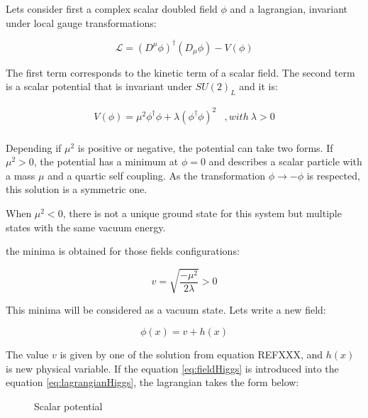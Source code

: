     Lets consider first a complex scalar doubled field $\phi$ and a lagrangian, invariant under local gauge transformations:

    \begin{equation}
      \mathcal{L} = \left(D^{\mu} \phi \right)^{\dagger} \left( D_{\mu} \phi \right) - V(\phi)
      \label{eq:lagrangianHiggs}
    \end{equation}             

    The first term corresponds to the kinetic term of a scalar field.
    The second term is a scalar potential that is invariant under $SU(2)_L$ and it is:

    \begin{equation}
      \begin{array}{lr}
        V(\phi) = \mu^{2}\phi^{\dagger}\phi + \lambda \left(\phi^{\dagger}\phi\right)^2  & , with \ \lambda > 0 \\
      \end{array}   
    \end{equation}
    
    Depending if $\mu^{2}$ is positive or negative, the potential can take two forms.
    If $\mu^{2} > 0$, the potential has a minimum at $\phi = 0$ and describes a scalar particle with a mass $\mu$ and a quartic self coupling.
    As the transformation $\phi \rightarrow  - \phi$ is respected, this solution is a symmetric one.

    When $\mu^{2} < 0$, there is not a unique ground state for this system but multiple states with the same vacuum energy.
    
    the minima is obtained for those fields configurations:

    \begin{equation}
      v = \sqrt{\frac{- \mu^2}{2\lambda}} > 0
    \end{equation}

    This minima will be considered as a vacuum state.
    Lets write a new field:

    \begin{equation}
      \phi(x) = v + h(x)
      \label{eq:fieldHiggs}
    \end{equation}

    The value $v$ is given by one of the solution from equation REFXXX, and $h(x)$ is new physical variable.
    If the equation \ref{eq:fieldHiggs} is introduced into the equation \ref{eq:lagrangianHiggs}, the lagrangian takes the form below:

    \begin{figure}[h]
    \centering
    \caption{Scalar potential}
    \label{fig:scalarPotential}
    \end{figure}

